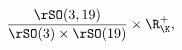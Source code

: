 \begin{equation}\frac{\rSO(3,19)}{\rSO(3)\times
\rSO(19)}\times \R^+_\K,\label{k3metrics}\end{equation} 
